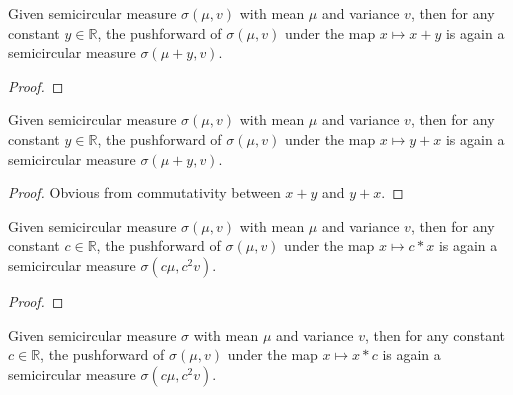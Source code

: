 \begin{lemma}
  \label{lem:semicircleReal_map_add_const}
  \leanok
  Given semicircular measure $\sigma(\mu, v)$ with mean $\mu$ and variance $v$, then for any constant $y \in \mathbb{R}$, the pushforward
  of $\sigma(\mu, v)$ under the map $x \mapsto x + y$ is again a semicircular measure $\sigma(\mu + y, v)$.
\end{lemma}

\begin{proof}
  \leanok
\end{proof}


\begin{lemma}
  \label{lem:semicircleReal_map_const_add}
  \leanok
  Given semicircular measure $\sigma(\mu, v)$ with mean $\mu$ and variance $v$, then for any constant $y \in \mathbb{R}$, the pushforward
  of $\sigma(\mu, v)$ under the map $x \mapsto y + x$ is again a semicircular measure $\sigma(\mu + y, v)$.
\end{lemma}

\begin{proof}
  \leanok
  Obvious from commutativity between $x + y$ and $y + x$.
\end{proof}


\begin{lemma}
  \label{lem:semicircleReal_map_const_mul}
  \leanok
    Given semicircular measure $\sigma(\mu, v)$ with mean $\mu$ and variance $v$, then for any constant $c \in \mathbb{R}$, the pushforward
  of $\sigma(\mu, v)$ under the map $x \mapsto c * x$ is again a semicircular measure $\sigma(c\mu, c^2v)$.
\end{lemma}

\begin{proof}

\end{proof}



\begin{lemma}
  \label{lem:semicircleReal_map_mul_const}
  \leanok
   Given semicircular measure $\sigma$ with mean $\mu$ and variance $v$, then for any constant $c \in \mathbb{R}$, the pushforward
  of $\sigma(\mu, v)$ under the map $x \mapsto x * c$ is again a semicircular measure $\sigma(c\mu, c^2v)$.
\end{lemma}

